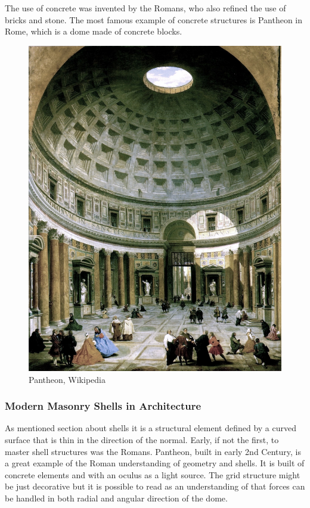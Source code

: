 The use of concrete was invented by the Romans, who also refined the use of bricks and stone. The most famous example of concrete structures is Pantheon in Rome, which is a dome made of concrete blocks.
\begin{figure}[H]
\centering
\includegraphics[width=0.5\linewidth ]{figure/Introduction/Pantheon.jpg}
\caption{Pantheon, Wikipedia}
\end{figure}


\subsubsection{Modern Masonry Shells in Architecture}

As mentioned section about shells it is a structural element defined by a curved surface that is thin in the direction of the normal. Early, if not the first, to master shell structures  was the Romans. Pantheon, built in early 2nd Century, is a great example of the Roman understanding of geometry and shells. It is built of concrete elements and with an oculus as a light source. The grid structure might be just decorative but it is possible to read as an understanding of that forces can be handled in both radial and angular direction of the dome.

